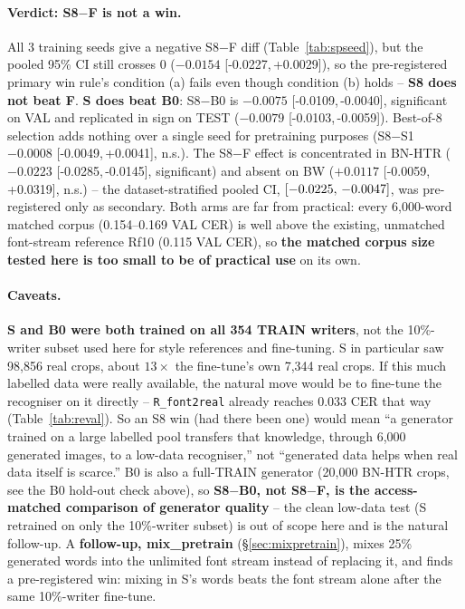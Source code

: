 \documentclass[10.5pt,a4paper]{article}
\newcommand{\fp}[1]{\nolinkurl{#1}}
\newcommand{\ci}[2]{{\footnotesize[#1,\,#2]}}
\begin{document}
\paragraph{Verdict: S8$-$F is not a win.} All 3 training seeds give a negative S8$-$F diff (Table~\ref{tab:spseed}), but
the pooled 95\% CI still crosses 0 ($-0.0154$ \ci{-0.0227}{+0.0029}), so the pre-registered primary win rule's condition
(a) fails even though condition (b) holds -- \textbf{S8 does not beat F}. \textbf{S does beat B0}: S8$-$B0 is
$-0.0075$ \ci{-0.0109}{-0.0040}, significant on VAL and replicated in sign on TEST ($-0.0079$ \ci{-0.0103}{-0.0059}).
Best-of-8 selection adds nothing over a single seed for pretraining purposes (S8$-$S1 $-0.0008$ \ci{-0.0049}{+0.0041},
n.s.). The S8$-$F effect is concentrated in BN-HTR ($-0.0223$ \ci{-0.0285}{-0.0145}, significant) and absent on BW
($+0.0117$ \ci{-0.0059}{+0.0319}, n.s.) -- the dataset-stratified pooled CI, $\ci{-0.0225}{-0.0047}$, was pre-registered
only as secondary. Both arms are far from practical: every 6,000-word matched corpus (0.154--0.169 VAL CER) is well above
the existing, unmatched font-stream reference Rf10 (0.115 VAL CER), so \textbf{the matched corpus size tested here is too
small to be of practical use} on its own.

\paragraph{Caveats.} \textbf{S and B0 were both trained on all 354 TRAIN writers}, not the 10\%-writer subset used here
for style references and fine-tuning. S in particular saw 98,856 real crops, about $13\times$ the fine-tune's own 7,344
real crops. If this much labelled data were really available, the natural move would be to fine-tune the recogniser on it
directly -- \fp{R\_font2real} already reaches 0.033 CER that way (Table~\ref{tab:reval}). So an S8 win (had there been one)
would mean ``a generator trained on a large labelled pool transfers that knowledge, through 6,000 generated images, to a
low-data recogniser,'' not ``generated data helps when real data itself is scarce.'' B0 is also a full-TRAIN generator
(20,000 BN-HTR crops, see the B0 hold-out check above), so \textbf{S8$-$B0, not S8$-$F, is the access-matched comparison of
generator quality} -- the clean low-data test (S retrained on only the 10\%-writer subset) is out of scope here and is the
natural follow-up. A \textbf{follow-up, mix\_pretrain} (\S\ref{sec:mixpretrain}), mixes 25\% generated words into the
unlimited font stream instead of replacing it, and finds a pre-registered win: mixing in S's words beats the font stream
alone after the same 10\%-writer fine-tune.
\end{document}
